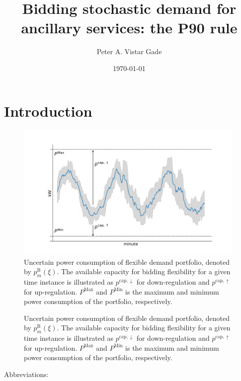 \documentclass{report}
\title{Bidding stochastic demand for ancillary services: the P90 rule}
\author{Peter A. Vistar Gade}
\date{\today}
\begin{document}
\maketitle


\section*{Introduction}


\begin{figure}[!t]
    \centering
    \includegraphics[width=0.99\textwidth]{figures/power_high_res_plot.png}
    \caption{Uncertain power consumption of flexible demand portfolio, denoted by $p_{m}^{\text{B}}(\xi)$. The available capacity for bidding flexibility for a given time instance is illustrated as $p^{\text{cap},\downarrow}$ for down-regulation and $p^{\text{cap},\uparrow}$ for up-regulation. $P^{\text{Max}}$ and $P^{\text{Min}}$ is the  maximum and minimum power consumption of the portfolio, respectively.}
    \label{fig:power}
\end{figure}

\begin{figure}[!t]
    \centering
    
    \caption{Uncertain power consumption of flexible demand portfolio, denoted by $p_{m}^{\text{B}}(\xi)$. The available capacity for bidding flexibility for a given time instance is illustrated as $p^{\text{cap},\downarrow}$ for down-regulation and $p^{\text{cap},\uparrow}$ for up-regulation. $P^{\text{Max}}$ and $P^{\text{Min}}$ is the  maximum and minimum power consumption of the portfolio, respectively.}
    \label{fig:power}
\end{figure}

\noindent Abbreviations:
\end{document}
